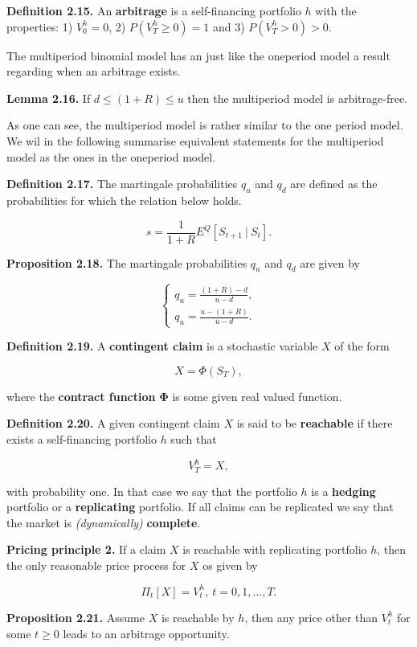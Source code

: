 \documentclass[
]{article}
\begin{document}
\textbf{Definition 2.15.} An \textbf{arbitrage} is a self-financing
portfolio \(h\) with the properties: 1) \(V^h_0=0\), 2)
\(P(V^h_T\ge 0)=1\) and 3) \(P(V^h_T>0)>0\).

The multiperiod binomial model has an just like the oneperiod model a
result regarding when an arbitrage exists.

\textbf{Lemma 2.16.} If \(d\le (1+R)\le u\) then the multiperiod model
is arbitrage-free.

As one can see, the multiperiod model is rather similar to the one
period model. We wil in the following summarise equivalent statements
for the multiperiod model as the ones in the oneperiod model.

\textbf{Definition 2.17.} The martingale probabilities \(q_u\) and
\(q_d\) are defined as the probabilities for which the relation below
holds.

\[
s=\frac{1}{1+R}E^Q[S_{t+1}\ \vert\ S_t].
\]

\textbf{Proposition 2.18.} The martingale probabilities \(q_u\) and
\(q_d\) are given by

\[
\left\{\begin{matrix}q_u=\frac{(1+R)-d}{u-d},\\ q_u=\frac{u-(1+R)}{u-d}.\end{matrix}\right.
\]

\textbf{Definition 2.19.} A \textbf{contingent claim} is a stochastic
variable \(X\) of the form

\[
X=\Phi(S_T),
\]

where the \textbf{contract function} \(\mathbf{\Phi}\) is some given
real valued function.

\textbf{Definition 2.20.} A given contingent claim \(X\) is said to be
\textbf{reachable} if there exists a self-financing portfolio \(h\) such
that

\[
V_T^h=X,
\]

with probability one. In that case we say that the portfolio \(h\) is a
\textbf{hedging} portfolio or a \textbf{replicating} portfolio. If all
claims can be replicated we say that the market is \emph{(dynamically)}
\textbf{complete}.

\textbf{Pricing principle 2.} If a claim \(X\) is reachable with
replicating portfolio \(h\), then the only reasonable price process for
\(X\) os given by

\[
\Pi_t[X]=V_t^h,\ t=0,1,...,T.
\]

\textbf{Proposition 2.21.} Assume \(X\) is reachable by \(h\), then any
price other than \(V_t^h\) for some \(t\ge 0\) leads to an arbitrage
opportunity.
\end{document}
